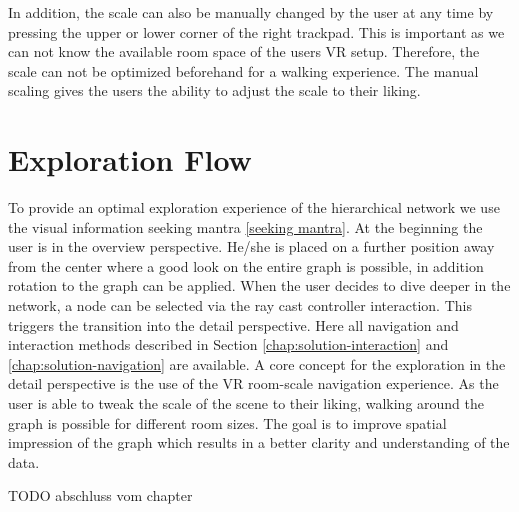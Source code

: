 In addition, the scale can also be manually changed by the user at any time by pressing the upper or lower corner of the right trackpad. 
This is important as we can not know the available room space of the users VR setup. Therefore, the scale can not be optimized beforehand for a walking experience. The manual scaling gives the users the ability to adjust the scale to their liking.
\section{Exploration Flow}
To provide an optimal exploration experience of the hierarchical network we use the visual information seeking mantra \ref{seeking mantra}. 
At the beginning the user is in the overview perspective. He/she is placed on a further position away from the center where a good look on the entire graph is possible, in addition rotation to the graph can be applied.
When the user decides to dive deeper in the network, a node can be selected via the ray cast controller interaction. This triggers the transition into the detail perspective. 
Here all navigation and interaction methods described in Section \ref{chap:solution-interaction} and \ref{chap:solution-navigation}
are available. 
A core concept for the exploration in the detail perspective is the use of the VR room-scale navigation experience. As the user is able to tweak the scale of the scene to their liking, walking around the graph is possible for different room sizes. The goal is to improve spatial impression of the graph which results in a better clarity and understanding of the data.

TODO abschluss vom chapter
